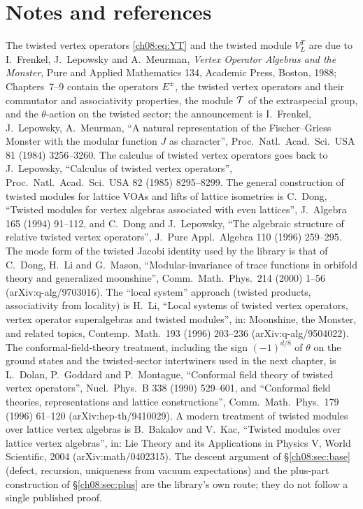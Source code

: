 \section{Notes and references}\label{ch08:sec:notes}

The twisted vertex operators \eqref{ch08:eq:YT} and the twisted module $V_L^T$ are due to
I.~Frenkel, J.~Lepowsky and A.~Meurman, \emph{Vertex Operator Algebras and the Monster}, Pure and
Applied Mathematics 134, Academic Press, Boston, 1988; Chapters~7--9 contain the operators
$E^\pm$, the twisted vertex operators and their commutator and associativity properties, the
module $\mathcal{T}$ of the extraspecial group, and the $\theta$-action on the twisted sector; the
announcement is I.~Frenkel, J.~Lepowsky, A.~Meurman, ``A natural representation of the
Fischer--Griess Monster with the modular function $J$ as character'', Proc.\ Natl.\ Acad.\ Sci.\ USA
81 (1984) 3256--3260.  The calculus of twisted vertex operators goes back to J.~Lepowsky,
``Calculus of twisted vertex operators'', Proc.\ Natl.\ Acad.\ Sci.\ USA 82 (1985) 8295--8299.  The
general construction of twisted modules for lattice VOAs and lifts of lattice isometries is
C.~Dong, ``Twisted modules for vertex algebras associated with even lattices'', J.\ Algebra 165
(1994) 91--112, and C.~Dong and J.~Lepowsky, ``The algebraic structure of relative twisted vertex
operators'', J.\ Pure Appl.\ Algebra 110 (1996) 259--295.  The mode form of the twisted Jacobi
identity used by the library is that of C.~Dong, H.~Li and G.~Mason, ``Modular-invariance of trace
functions in orbifold theory and generalized moonshine'', Comm.\ Math.\ Phys.\ 214 (2000) 1--56
(arXiv:q-alg/9703016).  The ``local system'' approach (twisted products, associativity from
locality) is H.~Li, ``Local systems of twisted vertex operators, vertex operator superalgebras and
twisted modules'', in: Moonshine, the Monster, and related topics, Contemp.\ Math.\ 193 (1996)
203--236 (arXiv:q-alg/9504022).  The conformal-field-theory treatment, including the sign
$(-1)^{d/8}$ of $\theta$ on the ground states and the twisted-sector intertwiners used in the next
chapter, is L.~Dolan, P.~Goddard and P.~Montague, ``Conformal field theory of twisted vertex
operators'', Nucl.\ Phys.\ B 338 (1990) 529--601, and ``Conformal field theories, representations
and lattice constructions'', Comm.\ Math.\ Phys.\ 179 (1996) 61--120 (arXiv:hep-th/9410029).  A
modern treatment of twisted modules over lattice vertex algebras is B.~Bakalov and V.~Kac,
``Twisted modules over lattice vertex algebras'', in: Lie Theory and its Applications in Physics V,
World Scientific, 2004 (arXiv:math/0402315).  The descent argument of \S\ref{ch08:sec:base} (defect,
recursion, uniqueness from vacuum expectations) and the plus-part construction of
\S\ref{ch08:sec:plus} are the library's own route; they do not follow a single published proof.
